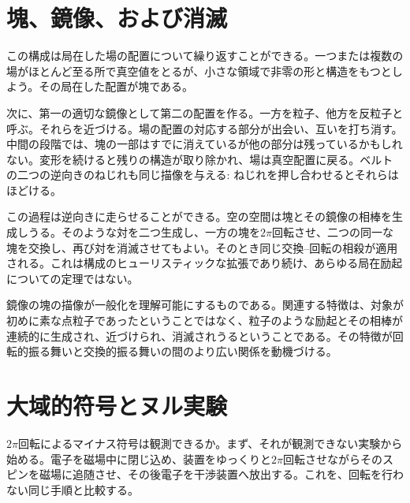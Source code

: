 \section{塊、鏡像、および消滅}

この構成は局在した場の配置について繰り返すことができる。一つまたは複数の場がほとんど至る所で真空値をとるが、小さな領域で非零の形と構造をもつとしよう。その局在した配置が塊である。

次に、第一の適切な鏡像として第二の配置を作る。一方を粒子、他方を反粒子と呼ぶ。それらを近づける。場の配置の対応する部分が出会い、互いを打ち消す。中間の段階では、塊の一部はすでに消えているが他の部分は残っているかもしれない。変形を続けると残りの構造が取り除かれ、場は真空配置に戻る。ベルトの二つの逆向きのねじれも同じ描像を与える: ねじれを押し合わせるとそれらはほどける。

この過程は逆向きに走らせることができる。空の空間は塊とその鏡像の相棒を生成しうる。そのような対を二つ生成し、一方の塊を\(2\pi\)回転させ、二つの同一な塊を交換し、再び対を消滅させてもよい。そのとき同じ交換--回転の相殺が適用される。これは構成のヒューリスティックな拡張であり続け、あらゆる局在励起についての定理ではない。

\begin{classroomqa}
\end{classroomqa}

鏡像の塊の描像が一般化を理解可能にするものである。関連する特徴は、対象が初めに素な点粒子であったということではなく、粒子のような励起とその相棒が連続的に生成され、近づけられ、消滅されうるということである。その特徴が回転的振る舞いと交換的振る舞いの間のより広い関係を動機づける。

\begin{classroomqa}
\end{classroomqa}

\section{大域的符号とヌル実験}

\(2\pi\)回転によるマイナス符号は観測できるか。まず、それが観測できない実験から始める。電子を磁場中に閉じ込め、装置をゆっくりと\(2\pi\)回転させながらそのスピンを磁場に追随させ、その後電子を干渉装置へ放出する。これを、回転を行わない同じ手順と比較する。

